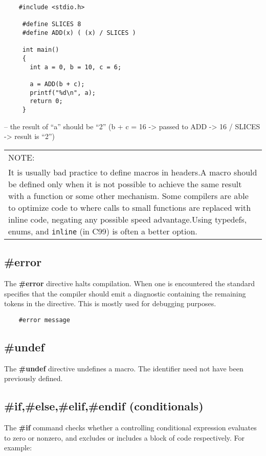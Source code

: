 \begin{verbatim}
	#include <stdio.h>
	
	 #define SLICES 8
	 #define ADD(x) ( (x) / SLICES )
	
	 int main() 
	 {
	   int a = 0, b = 10, c = 6;
	
	   a = ADD(b + c);
	   printf("%d\n", a);
	   return 0;
	 }
\end{verbatim}

-- the result of ``a'' should be ``2'' (b + c = 16 -\textgreater{} passed to ADD -\textgreater{} 16 / SLICES -\textgreater{} result is ``2'')

\begin{table}[H]
	\begin{tabular}{ p{} }
		 NOTE:\\It is usually bad practice to define macros in headers.A macro should be defined only when it is not possible to achieve the same result with a function or some other mechanism. Some compilers are able to optimize code to where calls to small functions are replaced with inline code, negating any possible speed advantage.Using typedefs, enums, and \texttt{inline} (in C99) is often a better option. \\
	\end{tabular}
\end{table}

\subsection{\#error}
The \textbf{\#error} directive halts compilation. When one is encountered the standard specifies that the compiler should emit a diagnostic containing the remaining tokens in the directive. This is mostly used for debugging purposes.

\begin{verbatim}
	#error message
\end{verbatim}

\subsection{\#undef}
The \textbf{\#undef} directive undefines a macro. The identifier need not have been previously defined.

\subsection{\#if,\#else,\#elif,\#endif (conditionals)}
The \textbf{\#if} command checks whether a controlling conditional expression evaluates to zero or nonzero, and excludes or includes a block of code respectively. For example:


